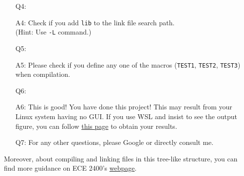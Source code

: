 \documentclass[english]{../TexTemplate/thesis}
\begin{document}
\begin{enumerate}
	\item [Q4:] 
	\item [A4:] Check if you add \verb'lib' to the link file search path.\\
	(Hint: Use \verb'-L' command.)

	\item [Q5:]
	\item [A5:] Please check if you define any one of the macros (\verb'TEST1', \verb'TEST2', \verb'TEST3') when compilation.

	\item [Q6:]
	\item [A6:] This is good! You have done this project! This may result from your Linux system having no GUI. If you use WSL and insist to see the output figure, you can follow \href{https://virtualizationreview.com/articles/2017/02/08/graphical-programs-on-windows-subsystem-on-linux.aspx}{this page} to obtain your results.

	\item [Q7:] For any other questions, please Google or directly consult me.
\end{enumerate}

Moreover, about compiling and linking files in this tree-like structure, you can find more guidance on ECE 2400's \href{https://cornell-ece2400.github.io/ece2400-docs/ece2400-sec2-c-basics/}{webpage}.
\end{document}
